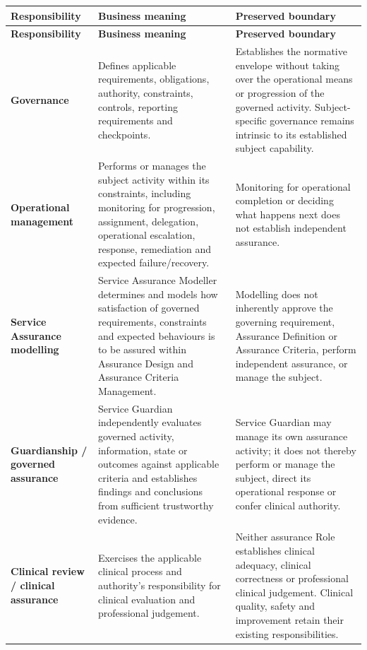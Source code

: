 \label{rad:assurance:29}
\begingroup\small\setlength{\TableWidth}{\dimexpr\linewidth-6\tabcolsep-4\arrayrulewidth\relax}
\begin{longtable}{|>{\raggedright\arraybackslash}p{0.24\TableWidth}|>{\raggedright\arraybackslash}p{0.33\TableWidth}|>{\raggedright\arraybackslash}p{0.43\TableWidth}|}
\hline\rowcolor{TableHead}\textbf{Responsibility} & \textbf{Business meaning} & \textbf{Preserved boundary}\\\hline\endfirsthead
\hline\rowcolor{TableHead}\textbf{Responsibility} & \textbf{Business meaning} & \textbf{Preserved boundary}\\\hline\endhead
\hline\endfoot
\textbf{Governance} & Defines applicable requirements, obligations, authority, constraints, controls, reporting requirements and checkpoints. & Establishes the normative envelope without taking over the operational means or progression of the governed activity. Subject-specific governance remains intrinsic to its established subject capability.\\\hline
\textbf{Operational management} & Performs or manages the subject activity within its constraints, including monitoring for progression, assignment, delegation, operational escalation, response, remediation and expected failure/\allowbreak{}recovery. & Monitoring for operational completion or deciding what happens next does not establish independent assurance.\\\hline
\textbf{Service Assurance modelling} & Service Assurance Modeller determines and models how satisfaction of governed requirements, constraints and expected behaviours is to be assured within Assurance Design and Assurance Criteria Management. & Modelling does not inherently approve the governing requirement, Assurance Definition or Assurance Criteria, perform independent assurance, or manage the subject.\\\hline
\textbf{Guardianship /\allowbreak{} governed assurance} & Service Guardian independently evaluates governed activity, information, state or outcomes against applicable criteria and establishes findings and conclusions from sufficient trustworthy evidence. & Service Guardian may manage its own assurance activity; it does not thereby perform or manage the subject, direct its operational response or confer clinical authority.\\\hline
\textbf{Clinical review /\allowbreak{} clinical assurance} & Exercises the applicable clinical process and authority's responsibility for clinical evaluation and professional judgement. & Neither assurance Role establishes clinical adequacy, clinical correctness or professional clinical judgement. Clinical quality, safety and improvement retain their existing responsibilities.\\\hline
\end{longtable}\endgroup
{}\label{rad:assurance:37}

